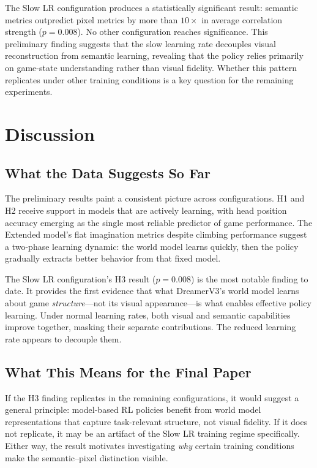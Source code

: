 \documentclass[letterpaper]{article}
\begin{document}
The Slow LR configuration produces a statistically significant result: semantic metrics outpredict pixel metrics by more than $10\times$ in average correlation strength ($p = 0.008$). No other configuration reaches significance. This preliminary finding suggests that the slow learning rate decouples visual reconstruction from semantic learning, revealing that the policy relies primarily on game-state understanding rather than visual fidelity. Whether this pattern replicates under other training conditions is a key question for the remaining experiments.


\section{Discussion}

\subsection{What the Data Suggests So Far}

The preliminary results paint a consistent picture across configurations. H1 and H2 receive support in models that are actively learning, with head position accuracy emerging as the single most reliable predictor of game performance. The Extended model's flat imagination metrics despite climbing performance suggest a two-phase learning dynamic: the world model learns quickly, then the policy gradually extracts better behavior from that fixed model.

The Slow LR configuration's H3 result ($p = 0.008$) is the most notable finding to date. It provides the first evidence that what DreamerV3's world model learns about game \textit{structure}---not its visual appearance---is what enables effective policy learning. Under normal learning rates, both visual and semantic capabilities improve together, masking their separate contributions. The reduced learning rate appears to decouple them.

\subsection{What This Means for the Final Paper}

If the H3 finding replicates in the remaining configurations, it would suggest a general principle: model-based RL policies benefit from world model representations that capture task-relevant structure, not visual fidelity. If it does not replicate, it may be an artifact of the Slow LR training regime specifically. Either way, the result motivates investigating \textit{why} certain training conditions make the semantic--pixel distinction visible.
\end{document}
